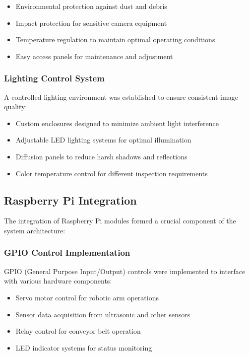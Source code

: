 \documentclass{book}
\begin{document}
\begin{itemize}
\item Environmental protection against dust and debris
\item Impact protection for sensitive camera equipment
\item Temperature regulation to maintain optimal operating conditions
\item Easy access panels for maintenance and adjustment
\end{itemize}

\subsubsection{Lighting Control System}
\par\noindent A controlled lighting environment was established to ensure consistent image quality:

\begin{itemize}
\item Custom enclosures designed to minimize ambient light interference
\item Adjustable LED lighting systems for optimal illumination
\item Diffusion panels to reduce harsh shadows and reflections
\item Color temperature control for different inspection requirements
\end{itemize}

\subsection{Raspberry Pi Integration}
\par\noindent The integration of Raspberry Pi modules formed a crucial component of the system architecture:

\subsubsection{GPIO Control Implementation}
\par\noindent GPIO (General Purpose Input/Output) controls were implemented to interface with various hardware components:

\begin{itemize}
\item Servo motor control for robotic arm operations
\item Sensor data acquisition from ultrasonic and other sensors
\item Relay control for conveyor belt operation
\item LED indicator systems for status monitoring
\end{itemize}
\end{document}

